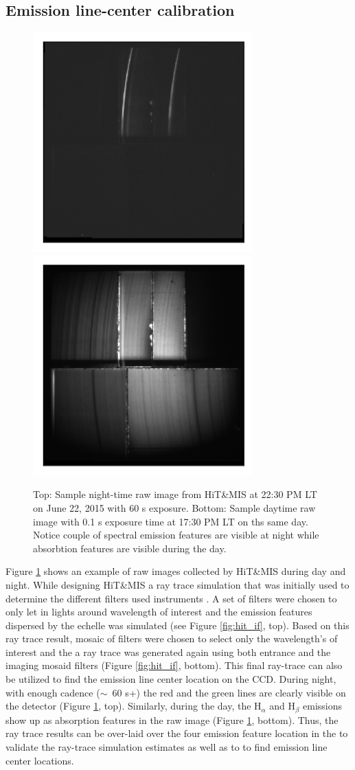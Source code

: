 \documentclass[crop=false,class=mitthesis,oneside,font=12pt]{standalone}
\begin{document}
\subsection{Emission line-center calibration}
\begin{figure}[H]
	\centering\includegraphics[width=20pc]{night_raw.png}
    \centering\includegraphics[width=20pc]{day_raw.png}
	\caption{Top: Sample night-time raw image from HiT\&MIS at 22:30 PM LT on June 22, 2015 with 60 s exposure. Bottom: Sample daytime raw image with 0.1 s exposure time at 17:30 PM LT on ths same day. Notice couple of spectral emission features are visible at night while absorbtion features are visible during the day.}
	\label{fig:raw_1}
\end{figure}
%
Figure \ref{fig:raw_1} shows an example of raw images collected by HiT\&MIS during day and night. While designing HiT\&MIS a ray trace simulation that was initially used to determine the different filters used instruments \citep{hitmis}. A set of filters were chosen to only let in lights around wavelength of interest and the emission features dispersed by the echelle was simulated (see Figure \ref{fig:hit_if}, top). Based on this ray trace result, mosaic of filters were chosen to select only the wavelength's of interest and the a ray trace was generated again using both entrance and the imaging mosaid filters (Figure \ref{fig:hit_if}, bottom). This final ray-trace can also be utilized to find the emission line center location on the CCD. During night, with enough cadence ($\sim$~60 s+) the red and the green lines are clearly visible on the detector (Figure \ref{fig:raw_1}, top). Similarly, during the day, the H$_\alpha$ and H$_\beta$ emissions show up as absorption features in the raw image (Figure \ref{fig:raw_1}, bottom). Thus, the ray trace results can be over-laid over the four emission feature location in the to validate the ray-trace simulation estimates as well as to to find emission line center locations. 
\end{document}
